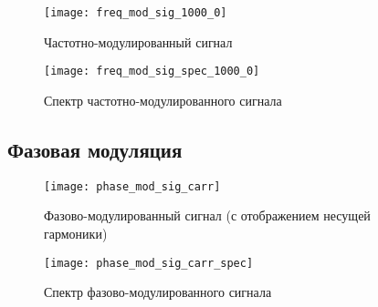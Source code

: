 \begin{figure}[H]
	\begin{center}
		\texttt{[image: freq\_mod\_sig\_1000\_0]}
		\caption{Частотно-модулированный сигнал} 
		\label{pic:freq_mod_sig_1000_0} %
	\end{center}
\end{figure}
\begin{figure}[H]
	\begin{center}
		\texttt{[image: freq\_mod\_sig\_spec\_1000\_0]}
		\caption{Спектр частотно-модулированного сигнала} 
		\label{pic:freq_mod_sig_spec_1000_0} %
	\end{center}
\end{figure}

\subsection{Фазовая модуляция}

\begin{figure}[H]
	\begin{center}
		\texttt{[image: phase\_mod\_sig\_carr]}
		\caption{Фазово-модулированный сигнал (с отображением несущей гармоники)} 
		\label{pic:phase_mod_sig_carr} %
	\end{center}
\end{figure}

\begin{figure}[H]
	\begin{center}
		\texttt{[image: phase\_mod\_sig\_carr\_spec]}
		\caption{Спектр фазово-модулированного сигнала} 
		\label{pic:phase_mod_sig_carr_spec} %
	\end{center}
\end{figure}


